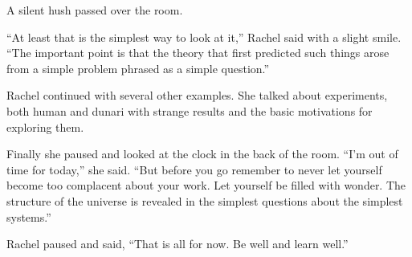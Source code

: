A silent hush passed over the room.


``At least that is the simplest way to look at it,'' Rachel said with a slight smile. ``The
important point is that the theory that first predicted such things arose from a simple problem
phrased as a simple question.''

Rachel continued with several other examples. She talked about experiments, both human and
dunari with strange results and the basic motivations for exploring them.

Finally she paused and looked at the clock in the back of the room. ``I'm out of time for
today,'' she said. ``But before you go remember to never let yourself become too complacent
about your work. Let yourself be filled with wonder. The structure of the universe is revealed
in the simplest questions about the simplest systems.''

Rachel paused and said, ``That is all for now. Be well and learn well.''

